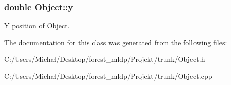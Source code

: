 \subsubsection[{\texorpdfstring{y}{y}}]{\setlength{\rightskip}{0pt plus 5cm}double Object\+::y\hspace{0.3cm}{\ttfamily [protected]}}\hypertarget{class_object_a542c4d6094ace575fb4a28f46b9cc6a1}{}\label{class_object_a542c4d6094ace575fb4a28f46b9cc6a1}
Y position of \hyperlink{class_object}{Object}. 

The documentation for this class was generated from the following files\+:\begin{DoxyCompactItemize}
\item 
C\+:/\+Users/\+Michał/\+Desktop/forest\+\_\+mldp/\+Projekt/trunk/Object.\+h\item 
C\+:/\+Users/\+Michał/\+Desktop/forest\+\_\+mldp/\+Projekt/trunk/Object.\+cpp\end{DoxyCompactItemize}
